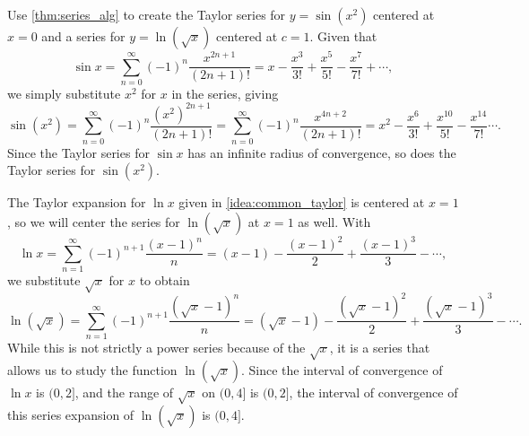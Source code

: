 \begin{example}\label{ex_ts6}
Use \autoref{thm:series_alg} to create the Taylor series for $y=\sin(x^2)$ centered at $x=0$ and a series for $y=\ln (\sqrt{x})$ centered at $c=1$.
Given that 
\[\sin x = \sum_{n=0}^\infty (-1)^n\frac{x^{2n+1}}{(2n+1)!} = x-\frac{x^3}{3!}+\frac{x^5}{5!} -\frac{x^7}{7!}+\dotsb,\]
we simply substitute $x^2$ for $x$ in the series, giving
\[
\sin (x^2) = \sum_{n=0}^\infty (-1)^n\frac{(x^2)^{2n+1}}{(2n+1)!} = \sum_{n=0}^\infty (-1)^n\frac{x^{4n+2}}{(2n+1)!} = x^2-\frac{x^6}{3!}+\frac{x^{10}}{5!} -\frac{x^{14}}{7!}\dotsb.
\]
Since the Taylor series for $\sin x$ has an infinite radius of convergence, so does the Taylor series for $\sin(x^2)$.\bigskip

The Taylor expansion for $\ln x$ given in \autoref{idea:common_taylor} is centered at $x=1$, so we will center the series for $\ln (\sqrt{x})$ at $x=1$ as well.
With 
\[\ln x = \sum_{n=1}^\infty(-1)^{n+1}\frac{(x-1)^n}{n} = (x-1)- \frac{(x-1)^2}{2} +\frac{(x-1)^3}{3}-\dotsb,\]
we substitute $\sqrt{x}$ for $x$ to obtain
\[\ln (\sqrt{x}) = \sum_{n=1}^\infty(-1)^{n+1}\frac{(\sqrt{x}-1)^n}{n} = (\sqrt{x}-1)- \frac{(\sqrt{x}-1)^2}{2} +\frac{(\sqrt{x}-1)^3}{3}-\dotsb.\]
While this is not strictly a power series because of the $\sqrt x$, it is a series that allows us to study the function $\ln(\sqrt{x})$. Since the interval of convergence of $\ln x$ is $(0,2]$, and the range of $\sqrt{x}$ on $(0,4]$ is $(0,2]$, the interval of convergence of this series expansion of $\ln(\sqrt{x})$ is $(0,4]$.
\end{example}

